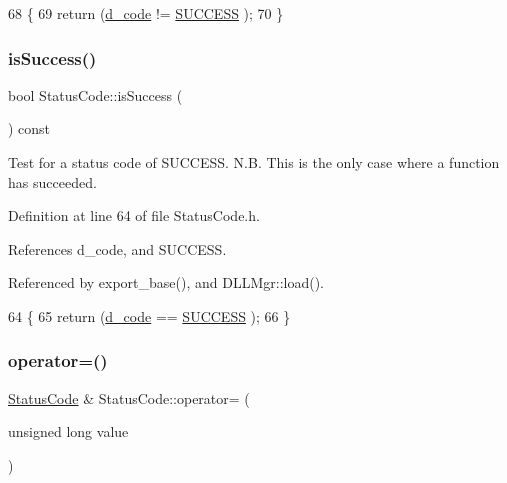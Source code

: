 \begin{DoxyCode}
68                                         \{
69   \textcolor{keywordflow}{return} (\hyperlink{classStatusCode_aff37ebcb323b897044b42d303cf72d93}{d\_code} != \hyperlink{classStatusCode_a6f565cbeadc76d14c72f047e5e85eb4badd0da38d3ba0d922efd1f4619bc37ad8}{SUCCESS} );
70 \}
\end{DoxyCode}
\mbox{\label{classStatusCode_acfe5ce8b2bb7d3d651fb0108c18c05c3}} 
\subsubsection{\texorpdfstring{is\+Success()}{isSuccess()}}
{\footnotesize\ttfamily bool Status\+Code\+::is\+Success (\begin{DoxyParamCaption}{ }\end{DoxyParamCaption}) const\hspace{0.3cm}{\ttfamily [inline]}}

Test for a status code of S\+U\+C\+C\+E\+SS. N.\+B. This is the only case where a function has succeeded. 

Definition at line 64 of file Status\+Code.\+h.



References d\+\_\+code, and S\+U\+C\+C\+E\+SS.



Referenced by export\+\_\+base(), and D\+L\+L\+Mgr\+::load().


\begin{DoxyCode}
64                                         \{
65   \textcolor{keywordflow}{return} (\hyperlink{classStatusCode_aff37ebcb323b897044b42d303cf72d93}{d\_code} == \hyperlink{classStatusCode_a6f565cbeadc76d14c72f047e5e85eb4badd0da38d3ba0d922efd1f4619bc37ad8}{SUCCESS} );
66 \}
\end{DoxyCode}
\mbox{\label{classStatusCode_af5179c5605558840cefe14e2794265de}} 
\subsubsection{\texorpdfstring{operator=()}{operator=()}}
{\footnotesize\ttfamily \hyperlink{classStatusCode}{Status\+Code} \& Status\+Code\+::operator= (\begin{DoxyParamCaption}\item[{unsigned long}]{value }\end{DoxyParamCaption})\hspace{0.3cm}{\ttfamily [inline]}}



